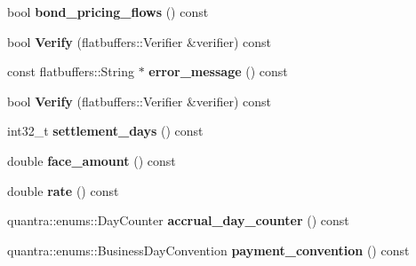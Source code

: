 \begin{DoxyCompactItemize}
bool {\bfseries bond\+\_\+pricing\+\_\+flows} () const
\item 
\mbox{\label{structquantra_1_1FLATBUFFERS__FINAL__CLASS_aed693ee5a45b5f53af7411f9cab6793a}} 
bool {\bfseries Verify} (flatbuffers\+::\+Verifier \&verifier) const
\item 
\mbox{\label{structquantra_1_1FLATBUFFERS__FINAL__CLASS_a4fb1ac638f3b9744e24fab7b4242df96}} 
const flatbuffers\+::\+String $\ast$ {\bfseries error\+\_\+message} () const
\item 
\mbox{\label{structquantra_1_1FLATBUFFERS__FINAL__CLASS_aed693ee5a45b5f53af7411f9cab6793a}} 
bool {\bfseries Verify} (flatbuffers\+::\+Verifier \&verifier) const
\item 
\mbox{\label{structquantra_1_1FLATBUFFERS__FINAL__CLASS_a2f95c4a4ab25cb17f5252fd7e6962827}} 
int32\+\_\+t {\bfseries settlement\+\_\+days} () const
\item 
\mbox{\label{structquantra_1_1FLATBUFFERS__FINAL__CLASS_a18b1ae24369d0fda26e8523a2afb53de}} 
double {\bfseries face\+\_\+amount} () const
\item 
\mbox{\label{structquantra_1_1FLATBUFFERS__FINAL__CLASS_a721326ea4afbe7a7cc21575f53f47324}} 
double {\bfseries rate} () const
\item 
\mbox{\label{structquantra_1_1FLATBUFFERS__FINAL__CLASS_ab03cf65ed2e6f70813f3bc9f43d2ca48}} 
quantra\+::enums\+::\+Day\+Counter {\bfseries accrual\+\_\+day\+\_\+counter} () const
\item 
\mbox{\label{structquantra_1_1FLATBUFFERS__FINAL__CLASS_a01ba679cdd14fe10a620e64fe2fae6c2}} 
quantra\+::enums\+::\+Business\+Day\+Convention {\bfseries payment\+\_\+convention} () const
\item 
\mbox{\label{structquantra_1_1FLATBUFFERS__FINAL__CLASS_a703292c01b0087fda51cd078d31ca15e}} 

\end{DoxyCompactItemize}
